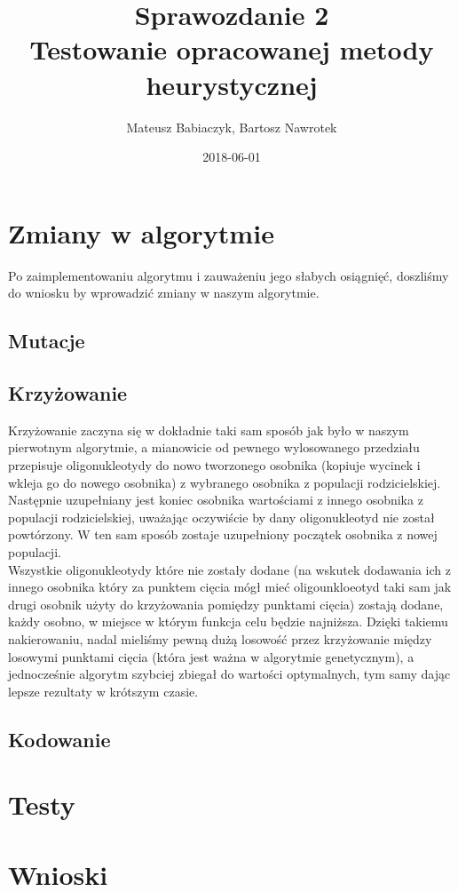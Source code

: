 \documentclass{article}
\title{Sprawozdanie 2 \\ Testowanie opracowanej metody heurystycznej}
\date{2018-06-01}
\author{Mateusz Babiaczyk, Bartosz Nawrotek}
\begin{document}
\maketitle
\section{Zmiany w algorytmie}  
Po zaimplementowaniu algorytmu i zauważeniu jego słabych osiągnięć, doszliśmy do wniosku by wprowadzić zmiany w naszym algorytmie. 
\subsection{Mutacje}
\subsection{Krzyżowanie}
Krzyżowanie zaczyna się w dokładnie taki sam sposób jak było w naszym pierwotnym algorytmie, a mianowicie od pewnego wylosowanego przedziału przepisuje oligonukleotydy do nowo tworzonego osobnika (kopiuje wycinek i wkleja go do nowego osobnika) z wybranego osobnika z populacji rodzicielskiej. Następnie uzupełniany jest koniec osobnika wartościami z innego osobnika z populacji rodzicielskiej, uważając oczywiście by dany oligonukleotyd nie został powtórzony. W ten sam sposób zostaje uzupełniony początek osobnika z nowej populacji. \\ Wszystkie oligonukleotydy które nie zostały dodane (na wskutek dodawania ich z innego osobnika który za punktem cięcia mógł mieć oligounkloeotyd taki sam jak drugi osobnik użyty do krzyżowania pomiędzy punktami cięcia) zostają dodane, każdy osobno, w miejsce w którym funkcja celu będzie najniższa. Dzięki takiemu nakierowaniu, nadal mieliśmy pewną dużą losowość przez krzyżowanie między losowymi punktami cięcia (która jest ważna w algorytmie genetycznym), a jednocześnie algorytm szybciej zbiegał do wartości optymalnych, tym samy dając lepsze rezultaty w krótszym czasie.
\subsection{Kodowanie}
\section{Testy}
\section{Wnioski}
\end{document}
